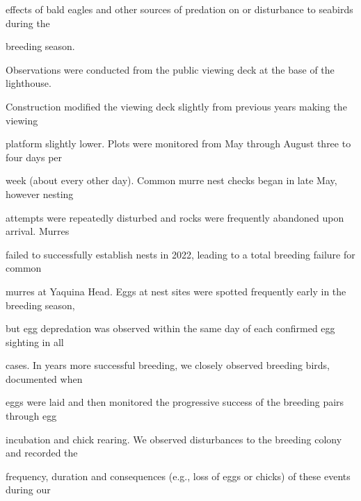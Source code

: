 \documentclass[
]{article}
\begin{document}
effects of bald eagles and other sources of predation on or disturbance
to seabirds during the

breeding season.

Observations were conducted from the public viewing deck at the base of
the lighthouse.

Construction modified the viewing deck slightly from previous years
making the viewing

platform slightly lower. Plots were monitored from May through August
three to four days per

week (about every other day). Common murre nest checks began in late
May, however nesting

attempts were repeatedly disturbed and rocks were frequently abandoned
upon arrival. Murres

failed to successfully establish nests in 2022, leading to a total
breeding failure for common

murres at Yaquina Head. Eggs at nest sites were spotted frequently early
in the breeding season,

but egg depredation was observed within the same day of each confirmed
egg sighting in all

cases. In years more successful breeding, we closely observed breeding
birds, documented when

eggs were laid and then monitored the progressive success of the
breeding pairs through egg

incubation and chick rearing. We observed disturbances to the breeding
colony and recorded the

frequency, duration and consequences (e.g., loss of eggs or chicks) of
these events during our
\end{document}
